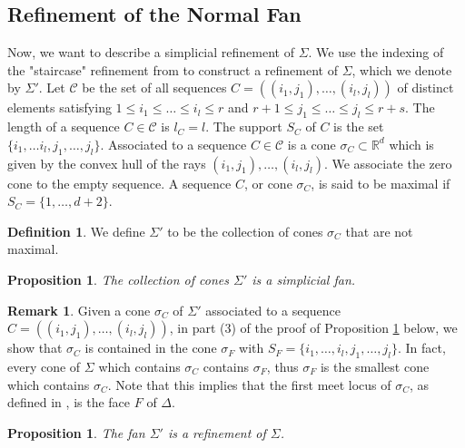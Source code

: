 \documentclass[11pt, reqno]{amsart}
\theoremstyle{plain}
\newtheorem{prop}[theo]{Proposition}
\theoremstyle{definition}
\newtheorem{defi}[theo]{Definition}
\newtheorem{rem}[theo]{Remark}
\newcommand{\R}{\mathbb{R}}
\begin{document}
\subsection*{Refinement of the Normal Fan} \label{subsection:refinemnet}
Now, we want to describe a simplicial refinement of $\Sigma$. 
We use the indexing of the "staircase" refinement from \cite{BCM} to construct a refinement of $\Sigma$, which we denote by $\Sigma'$.  Let $\mathcal{C}$ be the set of all sequences $C=((i_1,j_1),\dots, (i_l,j_l))$ of distinct elements satisfying $1\le i_1 \le \dots \le i_l \le r$ and $r+1\le j_1 \le \dots \le j_l \le r+s$.  
The length of a sequence $C \in \mathcal{C}$ is $l_C=l$. The support $S_C$ of $C$ is the set $\{i_1, \dots i_l,j_1,\dots, j_l\}$.  
Associated to a sequence $C \in \mathcal{C}$ is a cone $\sigma_C \subset \R^{d}$ which is given by the convex hull of the rays $(i_1,j_1),\dots, (i_l,j_l)$. We associate the zero cone to the empty sequence.
A sequence $C$, or cone $\sigma_C$, is said to be maximal if $S_C =\{1,\dots,d+2\}$.
\begin{defi}\label{defi:fan-refinement}
     We define $\Sigma'$ to be the collection of cones $\sigma_C$ that are not maximal.
\end{defi}

\begin{prop}\label{prop:sigma-is-a-fan}
    The collection of cones $\Sigma'$ is a simplicial fan.
\end{prop}

\begin{rem}\label{rem:first-meet}
Given a cone $\sigma_{C}$ of $\Sigma'$ associated to a sequence $C=((i_1,j_1),\dots, (i_l,j_l))$, in part (3) of the proof of Proposition \ref{prop:sigma-is-a-fan} below, we show that $\sigma_C$ is contained in the cone $\sigma_F$ with $S_F = \{i_1,\dots,i_l,j_1,\dots,j_l\}$. 
In fact, every cone of $\Sigma$ which contains $\sigma_{C}$ contains $\sigma_F$, thus $\sigma_F$ is the smallest cone which contains $\sigma_C$.
Note that this implies that the first meet locus of $\sigma_C$, as defined in \cite[\S 2.4]{Denef-Loeser}, is the face $F$ of $\Delta$.  
\end{rem}

\begin{prop}\label{prop:sigma-prime-is-a-refinement}
   The fan $\Sigma'$ is a refinement of $\Sigma$.
\end{prop}
\end{document}
